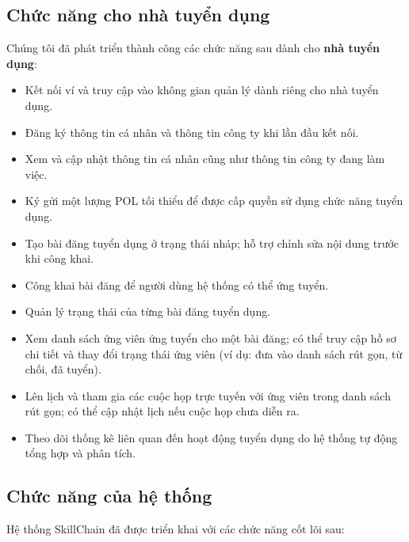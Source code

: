 \subsection{Chức năng cho nhà tuyển dụng}

Chúng tôi đã phát triển thành công các chức năng sau dành cho \textbf{nhà tuyển dụng}:

\begin{itemize}
  \item Kết nối ví và truy cập vào không gian quản lý dành riêng cho nhà tuyển dụng.
  \item Đăng ký thông tin cá nhân và thông tin công ty khi lần đầu kết nối.
  \item Xem và cập nhật thông tin cá nhân cũng như thông tin công ty đang làm việc.
  \item Ký gửi một lượng POL tối thiểu để được cấp quyền sử dụng chức năng tuyển dụng.
  \item Tạo bài đăng tuyển dụng ở trạng thái nháp; hỗ trợ chỉnh sửa nội dung trước khi công khai.
  \item Công khai bài đăng để người dùng hệ thống có thể ứng tuyển.
  \item Quản lý trạng thái của từng bài đăng tuyển dụng.
  \item Xem danh sách ứng viên ứng tuyển cho một bài đăng; có thể truy cập hồ sơ chi tiết và thay đổi trạng thái ứng viên (ví dụ: đưa vào danh sách rút gọn, từ chối, đã tuyển).
  \item Lên lịch và tham gia các cuộc họp trực tuyến với ứng viên trong danh sách rút gọn; có thể cập nhật lịch nếu cuộc họp chưa diễn ra.
  \item Theo dõi thống kê liên quan đến hoạt động tuyển dụng do hệ thống tự động tổng hợp và phân tích.
\end{itemize}

\subsection{Chức năng của hệ thống}

Hệ thống SkillChain đã được triển khai với các chức năng cốt lõi sau:


